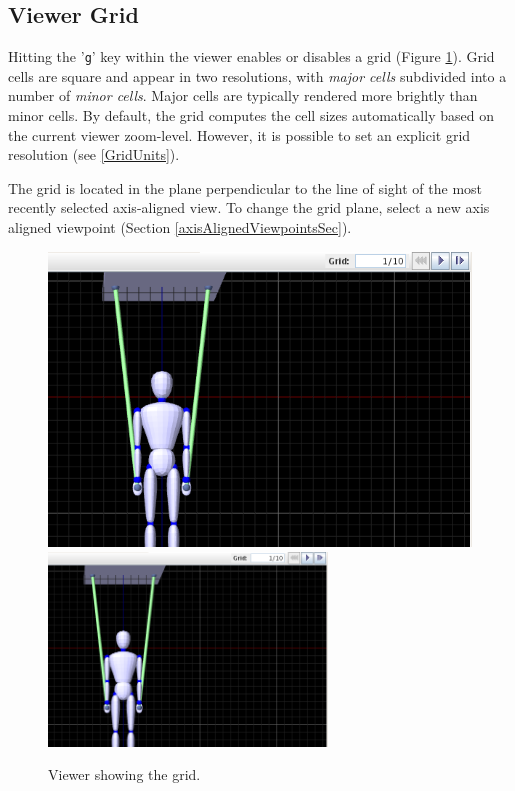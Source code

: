\documentclass{article}
\begin{document}
\subsection{Viewer Grid}
\label{ViewerGrid}

Hitting the '{\tt g}' key within the viewer enables or disables a grid
(Figure \ref{viewerGridFig}). Grid cells are square and appear in two
resolutions, with {\it major cells} subdivided into a number of {\it
minor cells}. Major cells are typically rendered more brightly than
minor cells. By default, the grid computes the cell sizes
automatically based on the current viewer zoom-level. However, it is
possible to set an explicit grid resolution (see
\ref{GridUnits}).

The grid is located in the plane perpendicular to the line of sight of
the most recently selected axis-aligned view. To change the grid
plane, select a new axis aligned viewpoint (Section
\ref{axisAlignedViewpointsSec}).

\begin{figure}
\begin{center}
\iflatexml
\includegraphics[]{images/viewerGrid}
\else
\includegraphics[width=0.66\textwidth]{images/viewerGrid}
\fi
\end{center}
\caption{Viewer showing the grid.}%
\label{viewerGridFig}
\end{figure}
\end{document}
